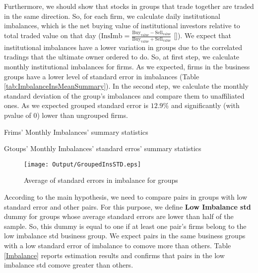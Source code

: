 	Furthermore, we should show that stocks in groups that trade together are traded in the same direction. So, for each firm, we calculate daily institutional imbalances, which is the net buying value of institutional investors relative to total traded value on that day ($ \text{InsImb} = \frac{\text{Buy}_{\text{value}} - \text{Sell}_{\text{value}}}{\text{Buy}_{\text{value}} + \text{Sell}_{\text{value}}} $ [\cite{seasholes2007predictable}]).
	We expect that institutional imbalances have a lower variation in groups due to the correlated tradings that the ultimate owner ordered to do. So, at first step, we calculate monthly institutional imbalances for firms. As we expected, firms in the business groups have a lower level of standard error in  imbalances (Table \ref{tab:ImbalanceInsMeanSummary}). In the second step, 	 we calculate the monthly standard deviation of the group's imbalances and compare them to unaffiliated ones. As we expected grouped standard error is  $12.9\%$ and significantly (with pvalue of 0) lower than ungrouped firms. 
	
	{\begin{table}[htbp]
		\centering
		\caption{Frims' Monthly Imbalances' summary statistics}
		\resizebox{0.75\textwidth}{!}{
			
		}
		\label{tab:ImbalanceInsMeanSummary}%
	\end{table}}
	{\begin{table}[htbp]
		\centering
		\caption{Gtoups' Monthly Imbalances' standard erros' summary statistics}
		\resizebox{0.75\textwidth}{!}{
			
		}
		\label{tab:ImbalanceInsStdSummary}%
\end{table}}
	\begin{figure}[htbp]
		\centering
		\texttt{[image: Output/GroupedInsSTD.eps]}
				\caption{Average of standard errors in imbalance for groups}
		\label{fig:GroupedInsSTD}
	\end{figure}
	
	According to the main hypothesis, we need to compare pairs in groups with low standard error and other pairs. For this purpose, we define \textbf{Low Imbalance std} dummy for groups whose average standard errors are lower than half of the sample. So, this dummy is equal to one if at least one pair's firms belong to the low imbalance std business group. We expect pairs in the same business groups with a low standard error of imbalance to comove more than others. Table \ref{Imbalance} reports estimation results and confirms that pairs in the low imbalance std comove greater than others. 
	
